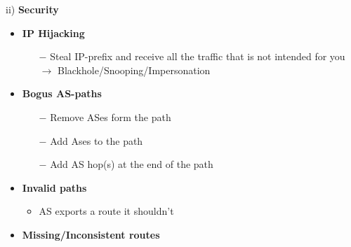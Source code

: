 \documentclass[a4paper, fontsize=8pt, landscape, DIV=1]{scrartcl}
\begin{document}
\begin{multicols*}{4}
		ii) \textbf{Security}
		\vspace{-0.2cm}
		\begin{itemize}[noitemsep]
			\item \textbf{IP Hijacking}
			\begin{itemize}
				\item[$-$] Steal IP-prefix and receive all the traffic that is not intended
				for you $\rightarrow$ Blackhole/Snooping/Impersonation 
			\end{itemize}
			\item \textbf{Bogus AS-paths}
			\begin{itemize}
				\item[$-$] Remove ASes form the path
				\item[$-$] Add Ases to the path
				\item[$-$] Add AS hop(s) at the end of the path
			\end{itemize}
			\item \textbf{Invalid paths}
			\begin{itemize}
				\item AS exports a route it shouldn't
			\end{itemize}
			\item \textbf{ Missing/Inconsistent routes}	
		\end{itemize}
		\par
		

\end{multicols*}
\end{document}
